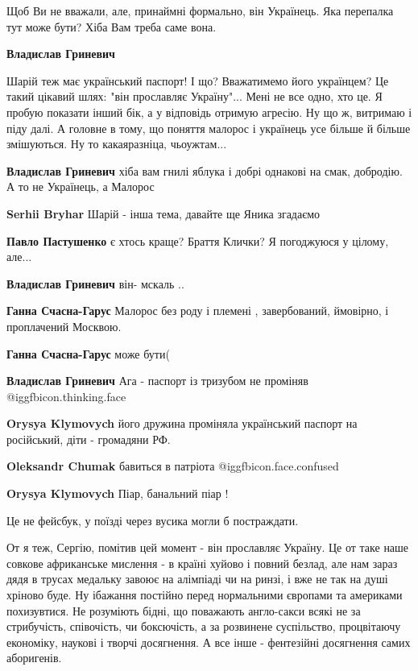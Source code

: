 \begin{itemize}
Щоб Ви не вважали, але, принаймні формально, він Українець. Яка перепалка тут
може бути? Хіба Вам треба саме вона.

\begin{itemize} %
\textbf{Владислав Гриневич} 

Шарій теж має український паспорт! І що? Вважатимемо його українцем? Це такий
цікавий шлях: "він прославляє Україну"... Мені не все одно, хто це. Я пробую
показати інший бік, а у відповідь отримую агресію. Ну що ж, витримаю і піду
далі. А головне в тому, що поняття малорос і українець усе більше й більше
змішуються. Ну то какаяразніца, чьоужтам...


\textbf{Владислав Гриневич} хіба вам гнилі яблука і добрі однакові на смак, добродію. А то не Українець, а Малорос

\textbf{Serhii Bryhar} Шарій - інша тема, давайте ще Яника згадаємо

\textbf{Павло Пастушенко} є хтось краще? Браття Клички?
Я погоджуюся у цілому, але...

\textbf{Владислав Гриневич} він- мскаль
..

\textbf{Ганна Счасна-Гарус} Малорос без роду і племені , завербований, ймовірно, і проплачений Москвою.

\textbf{Ганна Счасна-Гарус} може бути(
\end{itemize} %

\textbf{Владислав Гриневич}
Ага - паспорт із тризубом не проміняв  @igg{fbicon.thinking.face} 

\begin{itemize} %
\textbf{Orysya Klymovych} його дружина проміняла український паспорт на російський, діти - громадяни РФ.

\textbf{Oleksandr Chumak}
бавиться в патріота  @igg{fbicon.face.confused} 

\textbf{Orysya Klymovych} Піар, банальний піар !
\end{itemize} %

Це не фейсбук, у поїзді через вусика могли б постраждати.


От я теж, Сергію, помітив цей момент - він прославляє Україну. Це от таке наше
совкове африканське мислення - в країні хуйово і повний безлад, але нам зараз
дядя в трусах медальку завоює на алімпіаді чи на ринзі, і вже не так на душі
хріново буде. Ну ібажання постійно перед нормальними європами та америками
похизувтися. Не розуміють бідні, що поважають англо-сакси всякі не за
стрибучість, співочість, чи боксючість, а за розвинене суспільство, процвітаючу
економіку, наукові і творчі досягнення. А все інше - фентезійні досягнення
самих аборигенів.


\end{itemize}

